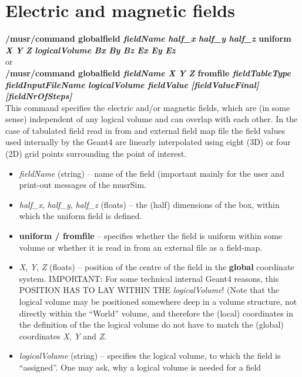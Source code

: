 \documentclass[twoside]{dis04}
\begin{document}
\section{Electric and magnetic fields}
\begin{description}
\item{\bf /musr/command globalfield \emph{fieldName} \emph{half\_x} \emph{half\_y} \emph{half\_z} uniform 
	\emph{X} \emph{Y} \emph{Z} \emph{logicalVolume} \emph{Bx} \emph{By} \emph{Bz} \emph{Ex} \emph{Ey} \emph{Ez}} \\
	or \\
	{\bf /musr/command globalfield \emph{fieldName} \emph{X} \emph{Y} \emph{Z} fromfile
	\emph{fieldTableType} \emph{fieldInputFileName} \emph{logicalVolume} \emph{fieldValue} 
	\emph{[fieldValueFinal]} \emph{[fieldNrOfSteps]}} \\
	This command specifies the electric and/or magnetic fields, which are (in some sense)
	independent of any logical volume and can overlap with each other.
	In the case of tabulated field read in from and external field map file the
	field values used internally by the Geant4 are linearly interpolated using
	eight (3D) or four (2D) grid points surrounding the point of interest.
%
	\begin{itemize}
	   \item \emph{fieldName} (string) -- name of the field (important mainly for the user and 
		print-out messages of the musrSim.
	   \item \emph{half\_x}, \emph{half\_y}, \emph{half\_z} (floats) -- the (half) dimensions
		of the box, within which the uniform field is defined.
	   \item {\bf uniform / fromfile} -- specifies whether the field is uniform within
		some volume or whether it is read in from an external file as a field-map.
	   \item \emph{X}, \emph{Y}, \emph{Z} (floats) -- position of the centre of the field
		in the {\bf global} coordinate system. IMPORTANT: For some technical internal
		Geant4 reasons, this POSITION HAS TO LAY WITHIN THE \emph{logicalVolume}!
		(Note that the logical volume may be positioned somewhere deep in a volume
                 structure, not directly within the ``World'' volume, and
		therefore the (local) coordinates in the definition of the the logical volume
		do not have to match the (global) coordinates \emph{X}, \emph{Y} and \emph{Z}.
	   \item \emph{logicalVolume} (string) -- specifies the logical volume, to which
		the field is ``assigned''.  One may ask, why a logical volume is needed for a field

\end{itemize}
\end{description}
\end{document}
